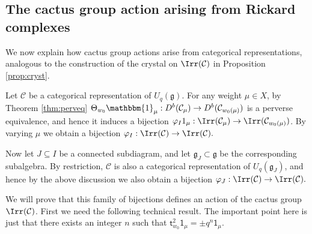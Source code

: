 \documentclass[11pt,reqno]{amsart}
\numberwithin{equation}{section}
\newtheorem{Theorem}[equation]{Theorem}
\theoremstyle{definition}
\theoremstyle{named}
\newcommand{\bB}{\mathbf{B}}
\newcommand{\cC}{\mathcal{C}}
\newcommand{\fg}{\mathfrak{g}}
\newcommand{\st}{\mathsf{t}}
\newcommand{\bone}{\mathbbm{1}}
\newcommand{\sone}{\mathsf{1}}
\begin{document}
%
%
%
%
%
%
%


\subsection{The cactus group action arising from Rickard complexes}
We now explain how  cactus group actions arise from categorical representations, analogous to the construction of the crystal on $\Irr(\cC)$ in Proposition \ref{prop:cryst}.

Let $\cC$ be a categorical representation of $U_q(\fg)$.  For any weight $\mu \in X$, by Theorem \ref{thm:perveq} $\Theta_{w_0}\bone_\mu:D^b(\cC_\mu) \to D^b(\cC_{w_0(\mu)})$ is a perverse equivalence, and hence it induces a bijection $\varphi_I1_\mu:\Irr(\cC_\mu) \to \Irr(\cC_{w_0(\mu)})$.  By varying $\mu$  we obtain a bijection 
$
\varphi_I:\Irr(\cC) \to \Irr(\cC).
$  

Now let $J\subseteq I$ be a connected subdiagram, and let $\fg_J \subset \fg$ be the corresponding subalgebra.  By restriction, $\cC$ is also a categorical representation of $U_q(\fg_J)$, and hence by the above discussion we also obtain a bijection $
\varphi_J:\Irr(\cC) \to \Irr(\cC).
$


We will prove that this family of bijections defines an action of the cactus group $\Irr(\cC)$.  First we need the following technical result.  The important point here is just that there exists an integer $n$ such that 
$\st^2_{w_0}\sone_\mu=\pm q^n\sone_\mu$.
\end{document}
